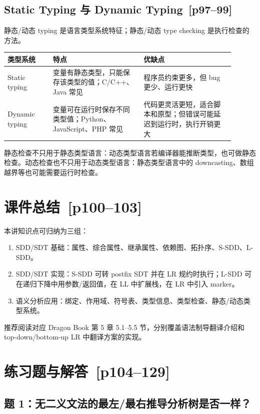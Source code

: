 \documentclass[UTF8,fontset=none,11pt]{ctexart}
\newcommand{\pg}[1]{\texorpdfstring{{\small\color{graytext}\,[p#1]}}{ [p#1]}}
\begin{document}
\subsection{Static Typing 与 Dynamic Typing \pg{97--99}}

静态/动态 typing 是语言类型系统特征；静态/动态 type checking 是执行检查的方法。

\begin{longtable}{L{0.18\linewidth}L{0.36\linewidth}L{0.36\linewidth}}
\toprule
类型系统 & 特点 & 优缺点 \\
\midrule
Static typing & 变量有静态类型，只能保存该类型的值；C/C++、Java 常见 & 程序员约束更多，但 bug 更少、运行更快 \\
Dynamic typing & 变量可在运行时保存不同类型值；Python、JavaScript、PHP 常见 & 代码更灵活更短，适合脚本和原型；但错误可能延迟到运行时，执行开销更大 \\
\bottomrule
\end{longtable}

静态检查不只用于静态类型语言：动态类型语言若编译器能推断类型，也可做静态检查。动态检查也不只用于动态类型语言：静态类型语言中的 downcasting、数组越界等也可能需要运行时检查。

\section{课件总结 \pg{100--103}}

本讲知识点可归纳为三组：

\begin{enumerate}
  \item SDD/SDT 基础：属性、综合属性、继承属性、依赖图、拓扑序、S-SDD、L-SDD。
  \item SDD/SDT 实现：S-SDD 可转 postfix SDT 并在 LR 规约时执行；L-SDD 可在递归下降中用参数/返回值，在 LL 中扩展栈，在 LR 中引入 marker。
  \item 语义分析应用：绑定、作用域、符号表、类型信息、类型检查、静态/动态类型系统。
\end{enumerate}

推荐阅读对应 Dragon Book 第 5 章 5.1--5.5 节，分别覆盖语法制导翻译介绍和 top-down/bottom-up LR 中翻译方案的实现。

\section{练习题与解答 \pg{104--129}}

\subsection*{题 1：无二义文法的最左/最右推导分析树是否一样？}
\end{document}
